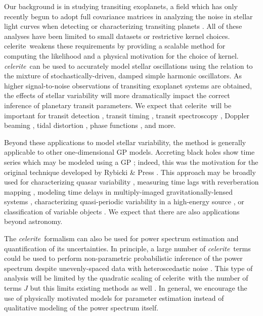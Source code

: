 \documentclass[manuscript, letterpaper]{aastex6}
\newcommand{\project}[1]{\textsf{#1}}
\newcommand{\celerite}{\project{celerite}}
\newcommand{\celeriteterm}{\emph{celerite}}
\begin{document}
Our background is in studying transiting exoplanets, a field which has only
recently begun to adopt full covariance matrices in analyzing the noise in
stellar light curves when detecting or characterizing transiting planets
\citep[for example,][]{Carter:2009, Gibson:2012, Barclay:2015, Evans:2015,
Aigrain:2016, Foreman-Mackey:2016b, Grunblatt:2016, Luger:2016}.
All of these analyses have been limited to small datasets or restrictive
kernel choices.
\celerite\ weakens these requirements by providing a scalable method for
computing the likelihood and a physical motivation for the choice of kernel.
\celeriteterm\ can be used to accurately model stellar oscillations using the
relation to the mixture of stochastically-driven, damped simple harmonic
oscillators.
As higher signal-to-noise observations of transiting exoplanet systems are
obtained, the effects of stellar variability will more dramatically impact the
correct inference of planetary transit parameters.
We expect that \celerite\ will be important for transit detection
\citep{Pope:2016, Foreman-Mackey:2016b}, transit timing \citep{Agol:2005,
Holman:2005}, transit spectroscopy \citep{Brown:2001}, Doppler beaming
\citep{Loeb:2003, Zucker:2007}, tidal distortion \citep{Zucker:2007}, phase
functions \citep{Knutson:2007, Zucker:2007}, and more.

Beyond these applications to model stellar variability, the method is
generally applicable to other one-dimensional GP models.
Accreting black holes show time series which may be modeled using a GP
\citep{Kelly:2014}; indeed, this was the motivation for the original technique
developed by Rybicki \& Press \citep{Rybicki:1992, Rybicki:1995}.
This approach may be broadly used for characterizing quasar variability
\citep{MacLeod:2010}, measuring time lags with reverberation mapping
\citep{Zu:2011, Pancoast:2014}, modeling time delays in multiply-imaged
gravitationally-lensed systems \citep{Press:1998}, characterizing
quasi-periodic variability in a high-energy source \citep{McAllister:2016}, or
classification of variable objects \citep{Zinn:2016}.
We expect that there are also applications beyond astronomy.

The \celeriteterm\ formalism can also be used for power spectrum estimation and
quantification of its uncertainties.
In principle, a large number of \celeriteterm\ terms could be used to perform
non-parametric probabilistic inference of the power spectrum despite
unevenly-spaced data with heteroscedastic noise \citep[for
example,][]{Wilson:2013, Kelly:2014}.
This type of analysis will be limited by the quadratic scaling of \celerite\
with the number of terms $J$ but this limits existing methods as well
\citep[CARMA models,][]{Kelly:2014}.
In general, we encourage the use of physically motivated models for parameter
estimation instead of qualitative modeling of the power spectrum itself.
\end{document}
